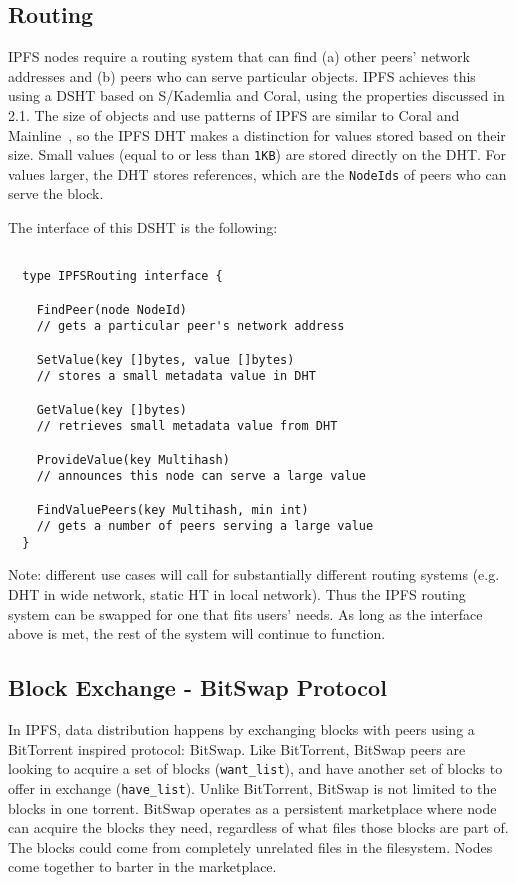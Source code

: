 \documentclass{sig-alternate}
\begin{document}
\subsection{Routing}

IPFS nodes require a routing system that can find (a) other peers' network addresses and (b) peers who can serve particular objects. IPFS achieves this using a DSHT based on S/Kademlia and Coral, using the properties discussed in 2.1. The size of objects and use patterns of IPFS are similar to Coral \cite{freedman04} and Mainline~\cite{wang13}, so the IPFS DHT makes a distinction for values stored based on their size. Small values (equal to or less than \texttt{1KB}) are stored directly on the DHT. For values larger, the DHT stores references, which are the \texttt{NodeIds} of peers who can serve the block.

The interface of this DSHT is the following:

\begin{verbatim}

  type IPFSRouting interface {

    FindPeer(node NodeId)
    // gets a particular peer's network address

    SetValue(key []bytes, value []bytes)
    // stores a small metadata value in DHT

    GetValue(key []bytes)
    // retrieves small metadata value from DHT

    ProvideValue(key Multihash)
    // announces this node can serve a large value

    FindValuePeers(key Multihash, min int)
    // gets a number of peers serving a large value
  }
\end{verbatim}

Note: different use cases will call for substantially different routing systems (e.g. DHT in wide network, static HT in local network). Thus the IPFS routing system can be swapped for one that fits users' needs. As long as the interface above is met, the rest of the system will continue to function.

\subsection{Block Exchange - BitSwap Protocol}

In IPFS, data distribution happens by exchanging blocks with peers using a
BitTorrent inspired protocol: BitSwap. Like BitTorrent, BitSwap peers are
looking to acquire a set of blocks (\texttt{want\_list}), and have another set
of blocks to offer in exchange (\texttt{have\_list}).
Unlike BitTorrent, BitSwap is not limited to the blocks in one torrent.
BitSwap operates as a persistent marketplace where node can acquire the
blocks they need, regardless of what files those blocks are part of. The
blocks could come from completely unrelated files in the filesystem.
Nodes come together to barter in the marketplace.
\end{document}

